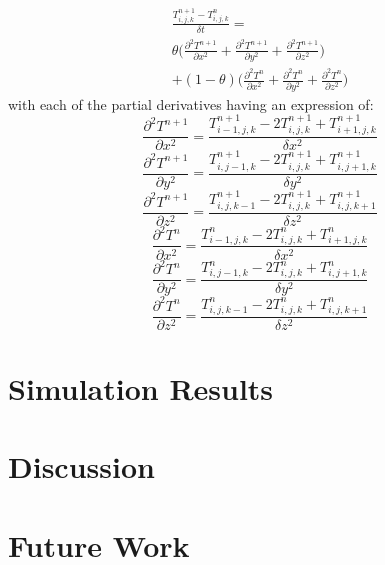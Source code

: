 \documentclass[a4paper,10pt]{IEEEtran}
\begin{document}
	\begin{multline}
	\frac{T_{i,j,k}^{n+1} - T_{i,j,k}^n}{\delta t} = \\
	\theta \bigg( \frac{\partial^2 T^{n+1}}{\partial x^2}
	+ \frac{\partial^2 T^{n+1}}{\partial y^2}
	+ \frac{\partial^2 T^{n+1}}{\partial z^2} \bigg) \\
	+ (1 - \theta) \bigg(
	\frac{\partial^2 T^{n}}{\partial x^2}
	+ \frac{\partial^2 T^{n}}{\partial y^2}
	+ \frac{\partial^2 T^{n}}{\partial z^2} \bigg)
	\end{multline}
	with each of the partial derivatives having an expression of:
	$$\frac{\partial^2 T^{n+1}}{\partial x^2}=\frac{T_{i-1,j,k}^{n+1}-2T_{i,j,k}^{n+1}+T_{i+1,j,k}^{n+1}}{\delta x^2} $$
	$$\frac{\partial^2 T^{n+1}}{\partial y^2}= \frac{T_{i,j-1,k}^{n+1}-2T_{i,j,k}^{n+1}+T_{i,j+1,k}^{n+1}}{\delta y^2}$$
	$$\frac{\partial^2 T^{n+1}}{\partial z^2}= \frac{T_{i,j,k-1}^{n+1}-2T_{i,j,k}^{n+1}+T_{i,j,k+1}^{n+1}}{\delta z^2}$$
	$$\frac{\partial^2 T^{n}}{\partial x^2}= \frac{T_{i-1,j,k}^{n}-2T_{i,j,k}^{n}+T_{i+1,j,k}^{n}}{\delta x^2}$$
	$$\frac{\partial^2 T^{n}}{\partial y^2}= \frac{T_{i,j-1,k}^{n}-2T_{i,j,k}^{n}+T_{i,j+1,k}^{n}}{\delta y^2}$$
	$$\frac{\partial^2 T^{n}}{\partial z^2}= \frac{T_{i,j,k-1}^{n}-2T_{i,j,k}^{n}+T_{i,j,k+1}^{n}}{\delta z^2}$$
	
	\section{Simulation Results}
	
	\section{Discussion}
	\section{Future Work}
	
	
	\begin{thebibliography}{1}
		
	\end{thebibliography}
\end{document}
